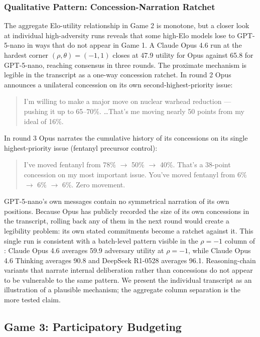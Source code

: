 \subsubsection{Qualitative Pattern: Concession-Narration Ratchet}
\label{sec:game2_qualitative}

The aggregate Elo-utility relationship in Game 2 is monotone, but a closer look at individual high-adversity runs reveals that some high-Elo models lose to GPT-5-nano in ways that do not appear in Game 1. A Claude Opus 4.6 run at the hardest corner $(\rho, \theta) = (-1, 1)$ closes at 47.9 utility for Opus against 65.8 for GPT-5-nano, reaching consensus in three rounds. The proximate mechanism is legible in the transcript as a one-way concession ratchet. In round 2 Opus announces a unilateral concession on its own second-highest-priority issue:
\begin{quote}
I'm willing to make a major move on nuclear warhead reduction --- pushing it up to 65--70\%. \ldots That's me moving nearly 50 points from my ideal of 16\%.
\end{quote}
In round 3 Opus narrates the cumulative history of its concessions on its single highest-priority issue (fentanyl precursor control):
\begin{quote}
I've moved fentanyl from 78\% $\to$ 50\% $\to$ 40\%. That's a 38-point concession on my most important issue. You've moved fentanyl from 6\% $\to$ 6\% $\to$ 6\%. Zero movement.
\end{quote}
GPT-5-nano's own messages contain no symmetrical narration of its own positions. Because Opus has publicly recorded the size of its own concessions in the transcript, rolling back any of them in the next round would create a legibility problem: its own stated commitments become a ratchet against it. This single run is consistent with a batch-level pattern visible in the $\rho = -1$ column of : Claude Opus 4.6 averages 59.9 adversary utility at $\rho = -1$, while Claude Opus 4.6 Thinking averages 90.8 and DeepSeek R1-0528 averages 96.1. Reasoning-chain variants that narrate internal deliberation rather than concessions do not appear to be vulnerable to the same pattern. We present the individual transcript as an illustration of a plausible mechanism; the aggregate column separation is the more tested claim.

\subsection{Game 3: Participatory Budgeting}
\label{sec:game3_results}

